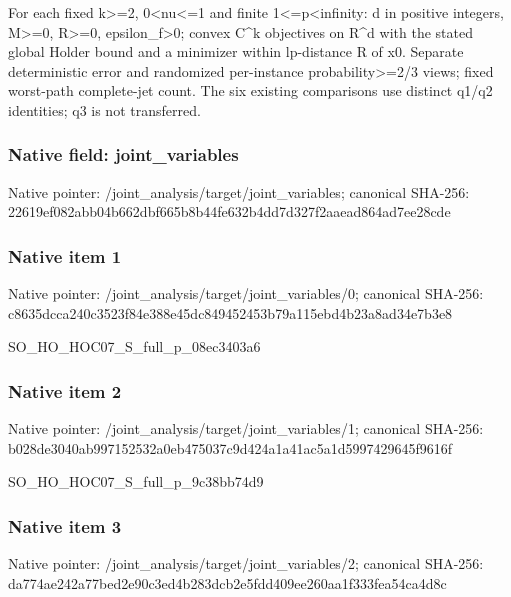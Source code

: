 \documentclass[10pt,a4paper]{article}
\begin{document}
\begingroup\raggedright\sloppy For each fixed k>=\allowbreak{}2,\allowbreak{} 0<nu<=\allowbreak{}1 and finite 1<=\allowbreak{}p<infinity:\allowbreak{} d in positive integers,\allowbreak{} M>=\allowbreak{}0,\allowbreak{} R>=\allowbreak{}0,\allowbreak{} epsilon\_\allowbreak{}f>0;\allowbreak{} convex C\textasciicircum{}k objectives on R\textasciicircum{}d with the stated global Holder bound and a minimizer within lp-distance R of x0. Separate deterministic error and randomized per-instance probability>=\allowbreak{}2/\allowbreak{}3 views;\allowbreak{} fixed worst-path complete-jet count. The six existing comparisons use distinct q1/\allowbreak{}q2 identities;\allowbreak{} q3 is not transferred.\par\endgroup

\subsubsection{Native field: joint\_\allowbreak{}variables}
Native pointer: /joint\_\allowbreak{}analysis/target/joint\_\allowbreak{}variables; canonical SHA-256: 22619ef082abb04b662dbf665b8b44fe632b4dd7d327f2aaead864ad7ee28cde

\subsubsection{Native item 1}
Native pointer: /joint\_\allowbreak{}analysis/target/joint\_\allowbreak{}variables/0; canonical SHA-256: c8635dcca240c3523f84e388e45dc849452453b79a115ebd4b23a8ad34e7b3e8

\begingroup\raggedright\sloppy SO\_\allowbreak{}HO\_\allowbreak{}HOC07\_\allowbreak{}S\_\allowbreak{}full\_\allowbreak{}p\_\allowbreak{}08ec3403a6\par\endgroup

\subsubsection{Native item 2}
Native pointer: /joint\_\allowbreak{}analysis/target/joint\_\allowbreak{}variables/1; canonical SHA-256: b028de3040ab997152532a0eb475037c9d424a1a41ac5a1d5997429645f9616f

\begingroup\raggedright\sloppy SO\_\allowbreak{}HO\_\allowbreak{}HOC07\_\allowbreak{}S\_\allowbreak{}full\_\allowbreak{}p\_\allowbreak{}9c38bb74d9\par\endgroup

\subsubsection{Native item 3}
Native pointer: /joint\_\allowbreak{}analysis/target/joint\_\allowbreak{}variables/2; canonical SHA-256: da774ae242a77bed2e90c3ed4b283dcb2e5fdd409ee260aa1f333fea54ca4d8c
\end{document}
